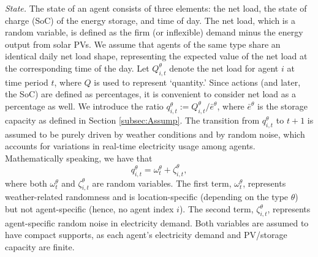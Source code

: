 \documentclass{article}
\theoremstyle{definition}
\theoremstyle{plain}
\begin{document}
\textit{State.} The state of an agent consists of three elements: the net load, the state of charge (SoC) of the energy storage, and time of day. The net load, which is a random variable, is defined as the firm (or inflexible) demand minus the energy output from solar PVs. We assume that agents of the same type share an identical daily net load shape, representing the expected value of the net load at the corresponding time of the day. Let \( Q^{\theta}_{i,t} \) denote the net load for agent \( i \) at time period \( t \), where \( Q \) is used to represent `quantity.'
 Since actions (and later, the SoC) are defined as percentages, it is convenient to consider net load as a percentage as well. We introduce the ratio \(q^{\theta}_{i,t} := Q^{\theta}_{i,t}/{\bar{e}^{\theta}}\), where \(\bar{e}^{\theta}\) is the storage capacity as defined in Section \ref{subsec:Assump}.  The transition from $q^{\theta}_{i,t}$ to $t+1$ is assumed to be purely driven by weather conditions and by random noise, which accounts for variations in real-time electricity usage among agents. Mathematically speaking, we have that 
\begin{equation}\label{eq:q_decompose}
q^{\theta}_{i,t} = \omega^{\theta}_t + \zeta^{\theta}_{i,t}, 
\end{equation} where both \(\omega^{\theta}_t\) and \(\zeta^{\theta}_{i,t}\) are random variables. The first term, \(\omega^{\theta}_t\), represents weather-related randomness and is location-specific (depending on the type \(\theta\)) but not agent-specific (hence, no agent index \(i\)).
The second term, \(\zeta^{\theta}_{i,t}\), represents agent-specific random noise in electricity demand. Both variables are assumed to have compact supports, as each agent's electricity demand and PV/storage capacity are finite. 
\end{document}
